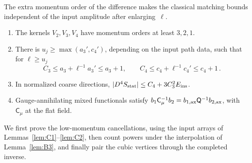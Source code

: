 The extra momentum order of the difference makes the classical matching bounds independent of the input amplitude after enlarging~$\ell$.
\begin{lemma}\label{lem:B5}
\begin{enumerate}[label=(\roman*)]
\item The kernels $V_2,V_3,V_4$ have momentum orders at least $3,2,1$.
\item There is $u_j\ge\max(a_3',c_4')$, depending on the input path data, such that for $\ell\ge u_j$
\begin{equation*}
C_3\le a_3+\ell^{-1}a_3'\le a_3+1,\qquad C_4\le c_4+\ell^{-1}c_4'\le c_4+1\,.
\end{equation*}
\item In normalized coarse directions, $|D^4S_{\rm stat}|\le C_4+3C_3^2E_{\rm ins}$.
\item Gauge-annihilating mixed functionals satisfy $b_1\mathsf C_\mu^{-1}b_2=b_{1,\rm ax}\mathsf Q^{-1}b_{2,\rm ax}$, with $\mathsf C_\mu$ at the flat field.
\end{enumerate}
\end{lemma}
We first prove the low-momentum cancellations, using the input arrays of Lemmas~\ref{lem:C1}--\ref{lem:C2}, then count powers under the interpolation of Lemma~\ref{lem:B3}, and finally pair the cubic vertices through the completed inverse.
